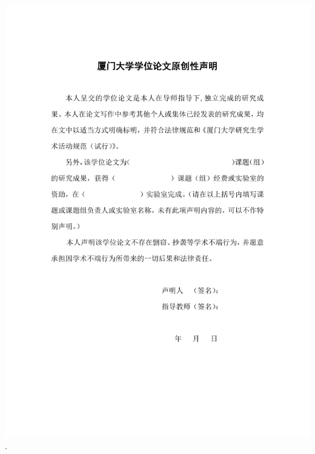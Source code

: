 \documentclass[12pt]{ctexbook}
\theoremstyle{definition}
\theoremstyle{remark}
\begin{document}
\vspace*{-10pt}
\hspace{-20pt}\includegraphics[clip,viewport=88 104 506 767,width=418pt]{org}\newpage.\newpage
\end{document}
